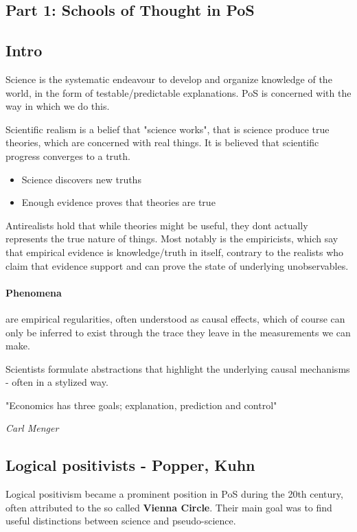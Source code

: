 \documentclass[12pt, a4paper]{article}
\begin{document}
\begin{multicols}{2}
\section{Part 1: Schools of Thought in PoS}

\subsection{Intro}
Science is the systematic endeavour to develop and organize knowledge of the world, in the form of testable/predictable explanations. PoS is concerned with the way in which we do this. 

Scientific realism is a belief that "science works", that is science produce true theories, which are concerned with real things. It is believed that scientific progress converges to a truth. 
\begin{itemize}
\item Science discovers new truths
\item Enough evidence proves that theories are true
\end{itemize}
Antirealists hold that while theories might be useful, they dont actually represents the true nature of things. Most notably is the empiricists, which say that empirical evidence is knowledge/truth in itself, contrary to the realists who claim that evidence support and can prove the state of underlying unobservables.

\paragraph{Phenomena} are empirical regularities, often understood as causal effects, which of course can only be inferred to exist through the trace they leave in the measurements we can make. 

Scientists formulate abstractions that highlight the underlying causal mechanisms - often in a stylized way.
\epigraph{"Economics has three goals; explanation, prediction and control"}{\textit{Carl Menger}}

\subsection{Logical positivists - Popper, Kuhn}
Logical positivism became a prominent position in PoS during the 20th century, often attributed to the so called \textbf{Vienna Circle}. Their main goal was to find useful distinctions between science and pseudo-science. 


\end{multicols}
\end{document}
